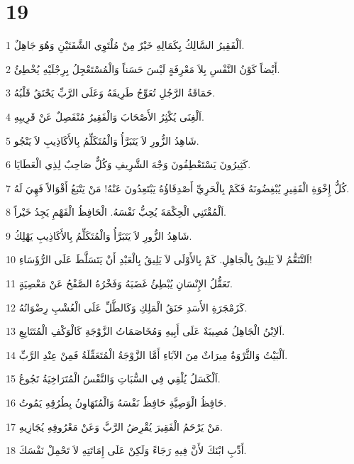 \chapter{19}

\par 1 اَلْفَقِيرُ السَّالِكُ بِكَمَالِهِ خَيْرٌ مِنْ مُلْتَوِي الشَّفَتَيْنِ وَهُوَ جَاهِلٌ.
\par 2 أَيْضاً كَوْنُ النَّفْسِ بِلاَ مَعْرِفَةٍ لَيْسَ حَسَناً وَالْمُسْتَعْجِلُ بِرِجْلَيْهِ يُخْطِئُ.
\par 3 حَمَاقَةُ الرَّجُلِ تُعَوِّجُ طَرِيقَهُ وَعَلَى الرَّبِّ يَحْنَقُ قَلْبُهُ.
\par 4 اَلْغِنَى يُكْثِرُ الأَصْحَابَ وَالْفَقِيرُ مُنْفَصِلٌ عَنْ قَرِيبِهِ.
\par 5 شَاهِدُ الزُّورِ لاَ يَتَبَرَّأُ وَالْمُتَكَلِّمُ بِالأَكَاذِيبِ لاَ يَنْجُو.
\par 6 كَثِيرُونَ يَسْتَعْطِفُونَ وَجْهَ الشَّرِيفِ وَكُلٌّ صَاحِبٌ لِذِي الْعَطَايَا.
\par 7 كُلُّ إِخْوَةِ الْفَقِيرِ يُبْغِضُونَهُ فَكَمْ بِالْحَرِيِّ أَصْدِقَاؤُهُ يَبْتَعِدُونَ عَنْهُ! مَنْ يَتْبَعُ أَقْوَالاً فَهِيَ لَهُ.
\par 8 اَلْمُقْتَنِي الْحِكْمَةَ يُحِبُّ نَفْسَهُ. الْحَافِظُ الْفَهْمِ يَجِدُ خَيْراً.
\par 9 شَاهِدُ الزُّورِ لاَ يَتَبَرَّأُ وَالْمُتَكَلِّمُ بِالأَكَاذِيبِ يَهْلِكُ.
\par 10 اَلتَّنَعُّمُ لاَ يَلِيقُ بِالْجَاهِلِ. كَمْ بِالأَوْلَى لاَ يَلِيقُ بِالْعَبْدِ أَنْ يَتَسَلَّطَ عَلَى الرُّؤَسَاءِ!
\par 11 تَعَقُّلُ الإِنْسَانِ يُبْطِئُ غَضَبَهُ وَفَخْرُهُ الصَّفْحُ عَنْ مَعْصِيَةٍ.
\par 12 كَزَمْجَرَةِ الأَسَدِ حَنَقُ الْمَلِكِ وَكَالطَّلِّ عَلَى الْعُشْبِ رِضْوَانُهُ.
\par 13 اَلاِبْنُ الْجَاهِلُ مُصِيبَةٌ عَلَى أَبِيهِ وَمُخَاصَمَاتُ الزَّوْجَةِ كَالْوَكْفِ الْمُتَتَابِعِ.
\par 14 اَلْبَيْتُ وَالثَّرْوَةُ مِيرَاثٌ مِنَ الآبَاءِ أَمَّا الزَّوْجَةُ الْمُتَعَقِّلَةُ فَمِنْ عِنْدِ الرَّبِّ.
\par 15 اَلْكَسَلُ يُلْقِي فِي السُّبَاتِ وَالنَّفْسُ الْمُتَرَاخِيَةُ تَجُوعُ.
\par 16 حَافِظُ الْوَصِيَّةِ حَافِظٌ نَفْسَهُ وَالْمُتَهَاوِنُ بِطُرُقِهِ يَمُوتُ.
\par 17 مَنْ يَرْحَمُ الْفَقِيرَ يُقْرِضُ الرَّبَّ وَعَنْ مَعْرُوفِهِ يُجَازِيهِ.
\par 18 أَدِّبِ ابْنَكَ لأَنَّ فِيهِ رَجَاءً وَلَكِنْ عَلَى إِمَاتَتِهِ لاَ تَحْمِلْ نَفْسَكَ.
